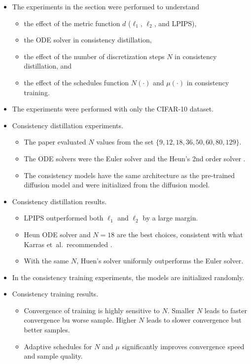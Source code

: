 \documentclass[10pt]{article}
\newcommand{\etal}{{et~al.}}
\begin{document}
\begin{itemize}
  \item The experiments in the section were performed to understand
  \begin{itemize}
    \item the effect of the metric function $d$ ($\ell_1$, $\ell_2$, and LPIPS),
    \item the ODE solver in consistency distillation,
    \item the effect of the number of discretization steps $N$ in consistency distillation, and
    \item the effect of the schedules function $N(\cdot)$ and $\mu(\cdot)$ in consistency training.
  \end{itemize} 

  \item The experiments were performed with only the CIFAR-10 dataset.
  
  \item Consistency distillation experiments.
  \begin{itemize}
    \item The paper evaluated $N$ values from the set $\{ 9, 12, 18, 36, 50, 60, 80, 129 \}$. 
    \item The ODE solvers were the Euler solver and the Heun's 2nd order solver \cite{Karras:2022}.
    \item The consistency models have the same architecture as the pre-trained diffusion model and were initialized from the diffusion model.
  \end{itemize}

  \item Consistency distillation results.
  \begin{itemize}
    \item LPIPS outperformed both $\ell_1$ and $\ell_2$ by a large margin.
    \item Heun ODE solver and $N = 18$ are the best choices, consistent with what Karras \etal\ recommended \cite{Karras:2022}.
    \item With the same $N$, Huen's solver uniformly outperforms the Euler solver. 
  \end{itemize}

  \item In the consistency training experiments, the models are initialized randomly.
  
  \item Consistency training results.
  \begin{itemize}
    \item Convergence of training is highly sensitive to $N$. Smaller $N$ leads to faster convergence bu worse sample. Higher $N$ leads to slower convergence but better samples.
    \item Adaptive schedules for $N$ and $\mu$ significantly improves convergence speed and sample quality.
  \end{itemize}
\end{itemize}
\end{document}

